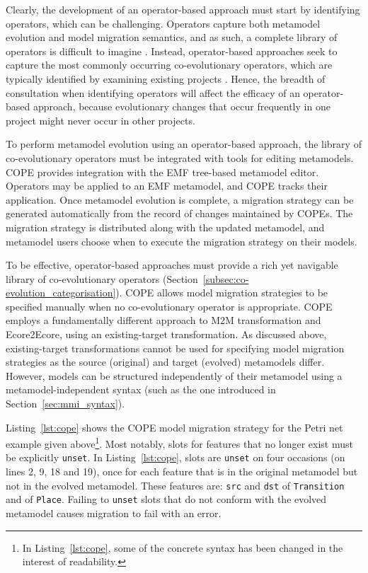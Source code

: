 Clearly, the development of an operator-based approach must start by identifying operators, which can be challenging. Operators capture both metamodel evolution and model migration semantics, and as such, a complete library of operators is difficult to imagine \cite{lerner00model}. Instead, operator-based approaches seek to capture the most commonly occurring co-evolutionary operators, which are typically identified by examining existing projects \cite{herrmannsdoerfer08automatability}. Hence, the breadth of consultation when identifying operators will affect the efficacy of an operator-based approach, because evolutionary changes that occur frequently in one project might never occur in other projects.

To perform metamodel evolution using an operator-based approach, the library of co-evolutionary operators must be integrated with tools for editing metamodels. COPE provides integration with the EMF tree-based metamodel editor. Operators may be applied to an EMF metamodel, and COPE tracks their application. Once metamodel evolution is complete, a migration strategy can be generated automatically from the record of changes maintained by COPEs. The migration strategy is distributed along with the updated metamodel, and metamodel users choose when to execute the migration strategy on their models.

To be effective, operator-based approaches must provide a rich yet navigable library of co-evolutionary operators (Section~\ref{subsec:co-evolution_categorisation}). COPE allows model migration strategies to be specified manually when no co-evolutionary operator is appropriate. COPE employs a fundamentally different approach to M2M transformation and Ecore2Ecore, using an existing-target transformation. As discussed above, existing-target transformations cannot be used for specifying model migration strategies as the source (original) and target (evolved) metamodels differ. However, models can be structured independently of their metamodel using a metamodel-independent syntax (such as the one introduced in Section~\ref{sec:mmi_syntax}).

Listing~\ref{lst:cope} shows the COPE model migration strategy for the Petri net example given above\footnote{In Listing~\ref{lst:cope}, some of the concrete syntax has been changed in the interest of readability.}. Most notably, slots for features that no longer exist must be explicitly \texttt{unset}. In Listing~\ref{lst:cope}, slots are \texttt{unset} on four occasions (on lines 2, 9, 18 and 19), once for each feature that is in the original metamodel but not in the evolved metamodel. These features are: \texttt{src} and \texttt{dst} of \texttt{Transition} and of \texttt{Place}. Failing to \texttt{unset} slots that do not conform with the evolved metamodel causes migration to fail with an error.

